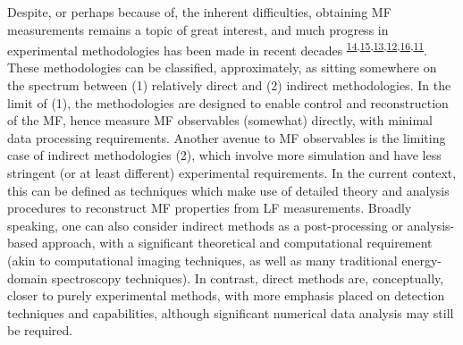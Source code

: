 \documentclass[10pt]{article}
\begin{document}
Despite, or perhaps because of, the inherent difficulties, obtaining  MF measurements remains a topic of great interest, and much progress in experimental methodologies has been made in recent decades \textsuperscript{\hyperref[csl:14]{14},\hyperref[csl:15]{15},\hyperref[csl:13]{13},\hyperref[csl:12]{12},\hyperref[csl:16]{16},\hyperref[csl:11]{11}}. 
These methodologies can be classified, approximately, as sitting somewhere on the spectrum between (1) relatively direct and (2) indirect methodologies. In the limit of (1), the methodologies are designed to enable control and reconstruction of the MF, hence measure MF observables (somewhat) directly, with minimal data processing requirements. Another avenue to MF observables is the limiting case of indirect methodologies (2), which involve more simulation and have less stringent (or at least different) experimental requirements. In the current context, this can be defined as techniques which make use of detailed theory and analysis procedures to reconstruct MF properties from LF measurements. Broadly speaking, one can also consider indirect methods as a post-processing or analysis-based approach, with a significant theoretical and computational requirement (akin to computational imaging techniques, as well as many traditional energy-domain spectroscopy techniques). In contrast, direct methods are, conceptually, closer to purely experimental methods, with more emphasis placed on detection techniques and capabilities, although significant numerical data analysis may still be required. 
\end{document}
